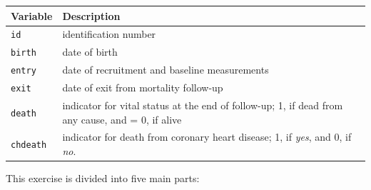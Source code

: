 \documentclass[
]{book}
\newcounter{none} %
\theoremstyle{definition}
\theoremstyle{definition}
\theoremstyle{definition}
\theoremstyle{definition}
\theoremstyle{remark}
\begin{document}
{\def\LTcaptype{none} %
\begin{longtable}[]{@{}
  >{\raggedright\arraybackslash}p{}
  >{\raggedright\arraybackslash}p{}@{}}
\toprule\noalign{}
\begin{minipage}[b]{\linewidth}\raggedright
Variable
\end{minipage} & \begin{minipage}[b]{\linewidth}\raggedright
Description
\end{minipage} \\
\midrule\noalign{}
\endhead
\bottomrule\noalign{}
\endlastfoot
\texttt{id} & identification number \\
\texttt{birth} & date of birth \\
\texttt{entry} & date of recruitment and baseline measurements \\
\texttt{exit} & date of exit from mortality follow-up \\
\texttt{death} & indicator for vital status at the end of follow-up; 1, if dead from any cause, and = 0, if alive \\
\texttt{chdeath} & indicator for death from coronary heart disease; 1, if \emph{yes}, and 0, if \emph{no}. \\
\end{longtable}
}

This exercise is divided into five main parts:
\end{document}
